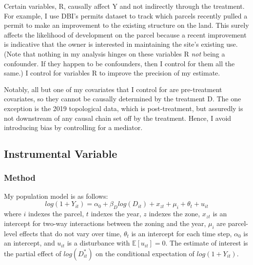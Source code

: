 \documentclass[a4paper,12pt]{article}
\begin{document}
Certain variables, R, causally affect Y and not indirectly through the treatment. For example, I use DBI's permits dataset to track which parcels recently pulled a permit to make an improvement to the existing structure on the land. This surely affects the likelihood of development on the parcel because a recent improvement is indicative that the owner is interested in maintaining the site's existing use.  (Note that nothing in my analysis hinges on these variables R \textit{not} being a confounder. If they happen to be confounders, then I control for them all the same.) I control for variables R to improve the precision of my estimate.\cite{cinelli2021crash}

Notably, all but one of my covariates that I control for are pre-treatment covariates, so they cannot be causally determined by the treatment D. The one exception is the 2019 topological data, which is post-treatment, but assuredly is not downstream of any causal chain set off by the treatment. Hence, I avoid introducing bias by controlling for a mediator.\cite{cinelli2021crash}


\subsection{Instrumental Variable}

\subsubsection{Method}

My population model is as follows:
\[
log(1 + Y_{it}) = \alpha_0 + \beta_{D}log(D_{it}) + x_{zt} + \mu_{i} + \theta_{t} + u_{it}
\]
where $i$ indexes the parcel, $t$ indexes the year, $z$ indexes the zone, $x_{zt}$ is an intercept for two-way interactions between the zoning and the year, $\mu_{i}$ are parcel-level effects that do not vary over time, $\theta_{t}$ is an intercept for each time step, $\alpha_{0}$ is an intercept, and $u_{it}$ is a disturbance with $\mathbb{E}[u_{it}] = 0$. The estimate of interest is the partial effect of $log(D^*_{it})$ on the conditional expectation of $log(1 + Y_{it})$.
\end{document}
